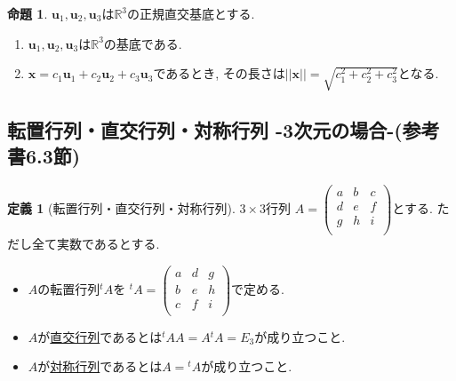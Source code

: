 \documentclass[dvipdfmx,a4paper,11pt]{article}
\newcommand{\R}{\mathbb{R}}
\theoremstyle{definition}
\newtheorem{prop}[thm]{命題}
\newtheorem{dfn}[thm]{定義}
\begin{document}
   \begin{tcolorbox}[
    colback = white,
    colframe = green!35!black,
    fonttitle = \bfseries,
    breakable = true]
    \begin{prop}
   $\bm{u}_1, \bm{u}_2, \bm{u}_3$は$\R^3$の正規直交基底とする.
  \begin{enumerate}
  \setlength{\parskip}{0cm}
 \setlength{\itemsep}{0pt} 
\item  $\bm{u}_1, \bm{u}_2, \bm{u}_3$は$\R^3$の基底である.
\item $\bm{x} = c_1\bm{u}_1 + c_2\bm{u}_2 + c_3\bm{u}_3$であるとき, その長さは$|| \bm{x} ||=\sqrt{c_{1}^{2} + c_{2}^{2} + c_{3}^2}$となる. 
  \end{enumerate}
  \end{prop}
 \end{tcolorbox}
 
 
 
 \subsection{転置行列・直交行列・対称行列 -3次元の場合-(参考書6.3節)}
 
 \begin{tcolorbox}[
    colback = white,
    colframe = green!35!black,
    fonttitle = \bfseries,
    breakable = true]
    \begin{dfn}[転置行列・直交行列・対称行列]
$3\times 3$行列
$
A=\begin{pmatrix}
a& b &c\\
d & e& f\\
g & h& i \\
\end{pmatrix}
$とする. ただし全て実数であるとする. 
\begin{itemize}
\setlength{\parskip}{0cm}
 \setlength{\itemsep}{0pt} 
\item $A$の転置行列${}^t A$を
${}^t A =\begin{pmatrix}
a& d &g\\
b& e& h\\
c & f& i \\
\end{pmatrix}
$で定める.
\item $A$が\underline{直交行列}であるとは${}^t A A= A {}^t A = E_3$が成り立つこと.
\item $A$が\underline{対称行列}であるとは$ A= {}^t A$が成り立つこと.
\end{itemize}
\end{dfn}
 \end{tcolorbox}
 
\end{document}
